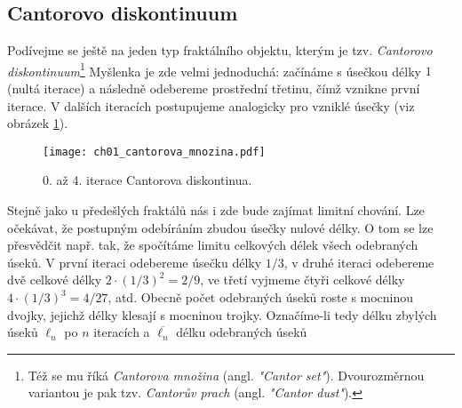 \subsection{Cantorovo diskontinuum}\label{subsec:cantorovo_diskontinuum}
Podívejme se ještě na jeden typ fraktálního objektu, kterým je tzv. \emph{Cantorovo diskontinuum}\footnote{Též se mu říká \emph{Cantorova množina} (angl. \emph{"Cantor set"}). Dvourozměrnou variantou je pak tzv. \emph{Cantorův prach} (angl. \emph{"Cantor dust"}).} Myšlenka je zde velmi jednoduchá: začínáme s úsečkou délky $1$ (nultá iterace) a následně odebereme prostřední třetinu, čímž vznikne první iterace. V dalších iteracích postupujeme analogicky pro vzniklé úsečky (viz obrázek \ref{fig:cantorovo_diskontinuum}).
\begin{figure}[h]
    \centering
    \texttt{[image: ch01\_cantorova\_mnozina.pdf]}
    \caption{0. až 4. iterace Cantorova diskontinua.}
    \label{fig:cantorovo_diskontinuum}
\end{figure}

Stejně jako u předešlých fraktálů nás i zde bude zajímat limitní chování. Lze očekávat, že postupným odebíráním zbudou úsečky nulové délky. O tom se lze přesvědčit např. tak, že spočítáme limitu celkových délek všech odebraných úseků. V první iteraci odebereme úsečku délky $1/3$, v druhé iteraci odebereme dvě celkové délky $2\cdot(1/3)^2=2/9$, ve třetí vyjmeme čtyři celkové délky $4\cdot(1/3)^3=4/27$, atd. Obecně počet odebraných úseků roste s mocninou dvojky, jejichž délky klesají s mocninou trojky. Označíme-li tedy délku zbylých úseků $\ell_n$ po $n$ iteracích a $\overline{\ell_n}$ délku odebraných úseků 